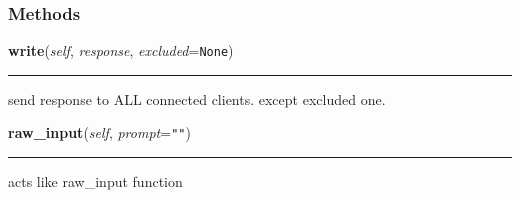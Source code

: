     \label{server:sockobject}


  \subsubsection{Methods}

    \label{server:sockobject:write}

    \vspace{0.5ex}

    \begin{boxedminipage}{\textwidth}

    \raggedright \textbf{write}(\textit{self}, \textit{response}, \textit{excluded}=\texttt{None})

    \vspace{-1.5ex}

    \rule{\textwidth}{0.5\fboxrule}
    send response to ALL connected clients. except excluded one.

    \vspace{1ex}

    \end{boxedminipage}

    \label{server:sockobject:raw_input}

    \vspace{0.5ex}

    \begin{boxedminipage}{\textwidth}

    \raggedright \textbf{raw\_input}(\textit{self}, \textit{prompt}=\texttt{""})

    \vspace{-1.5ex}

    \rule{\textwidth}{0.5\fboxrule}
    acts like raw\_input function

    \vspace{1ex}

    \end{boxedminipage}

